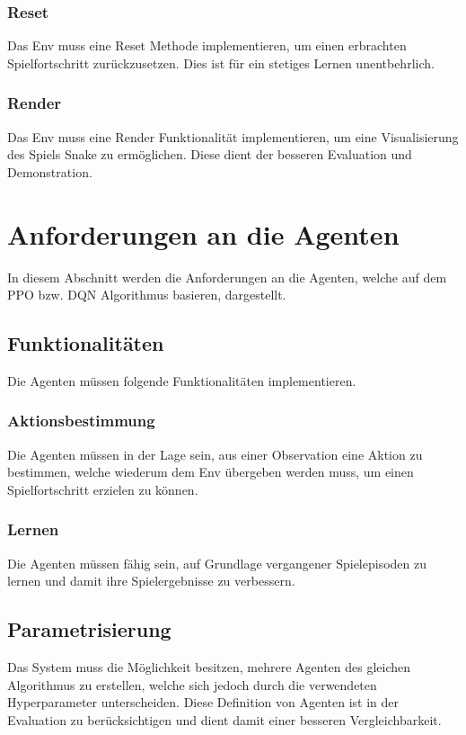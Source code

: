 \subsubsection{Reset} \label{sec:Anforderung_Reset}
Das Env muss eine Reset Methode implementieren, um einen erbrachten Spielfortschritt zurückzusetzen. Dies ist für ein stetiges Lernen unentbehrlich.

\subsubsection{Render} \label{sec:visualisierung_Env}
Das Env muss eine Render Funktionalität implementieren, um eine Visualisierung des Spiels Snake zu ermöglichen. Diese dient der besseren Evaluation und Demonstration.

\section{Anforderungen an die Agenten}
In diesem Abschnitt werden die Anforderungen an die Agenten, welche auf dem PPO bzw. DQN Algorithmus basieren, dargestellt.

\subsection{Funktionalitäten} \label{sec:Agent_Funktionalitäten}
Die Agenten müssen folgende Funktionalitäten implementieren.

\subsubsection{Aktionsbestimmung}
Die Agenten müssen in der Lage sein, aus einer Observation eine Aktion zu bestimmen, welche wiederum dem Env übergeben werden muss, um einen Spielfortschritt erzielen zu können.

\subsubsection{Lernen}
Die Agenten müssen fähig sein, auf Grundlage vergangener Spielepisoden zu lernen und damit ihre Spielergebnisse zu verbessern.

\subsection{Parametrisierung} \label{sec:Anforderungen_Parametrisierung}
Das System muss die Möglichkeit besitzen, mehrere Agenten des gleichen Algorithmus zu erstellen, welche sich jedoch durch die verwendeten Hyperparameter unterscheiden. Diese Definition von Agenten ist in der Evaluation zu berücksichtigen und dient damit einer besseren Vergleichbarkeit.

